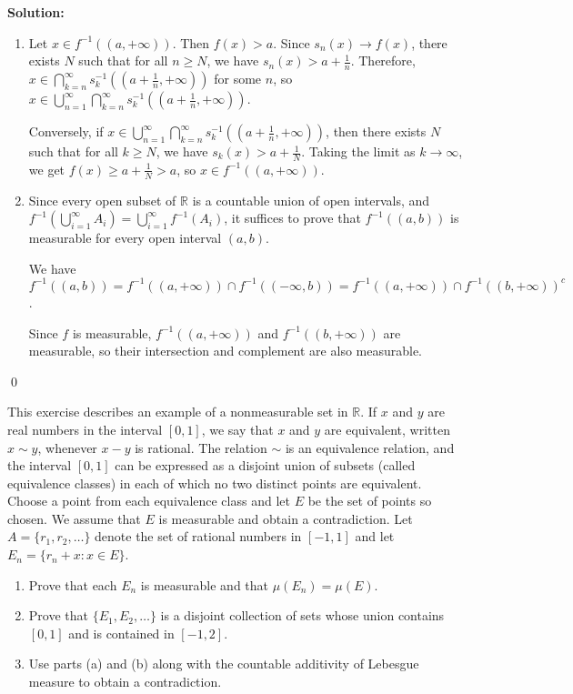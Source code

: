\bigskip\noindent\textbf{Solution:}
\begin{enumerate}[label=(\alph*)]
\item Let $x \in f^{-1}((a, +\infty))$. Then $f(x) > a$. Since $s_n(x) \to f(x)$, there exists $N$ such that for all $n \geq N$, we have $s_n(x) > a + \frac{1}{n}$. Therefore, $x \in \bigcap_{k=n}^\infty s_k^{-1}((a + \frac{1}{n}, +\infty))$ for some $n$, so $x \in \bigcup_{n=1}^\infty \bigcap_{k=n}^\infty s_k^{-1}((a + \frac{1}{n}, +\infty))$.

Conversely, if $x \in \bigcup_{n=1}^\infty \bigcap_{k=n}^\infty s_k^{-1}((a + \frac{1}{n}, +\infty))$, then there exists $N$ such that for all $k \geq N$, we have $s_k(x) > a + \frac{1}{N}$. Taking the limit as $k \to \infty$, we get $f(x) \geq a + \frac{1}{N} > a$, so $x \in f^{-1}((a, +\infty))$.

\item Since every open subset of $\mathbb{R}$ is a countable union of open intervals, and $f^{-1}(\bigcup_{i=1}^{\infty} A_i) = \bigcup_{i=1}^{\infty} f^{-1}(A_i)$, it suffices to prove that $f^{-1}((a, b))$ is measurable for every open interval $(a, b)$.

We have $f^{-1}((a, b)) = f^{-1}((a, +\infty)) \cap f^{-1}((-\infty, b)) = f^{-1}((a, +\infty)) \cap f^{-1}((b, +\infty))^c$.

Since $f$ is measurable, $f^{-1}((a, +\infty))$ and $f^{-1}((b, +\infty))$ are measurable, so their intersection and complement are also measurable.
\end{enumerate}\qed


\begin{problembox}
\begin{problemstatement}
This exercise describes an example of a nonmeasurable set in $\mathbb{R}$. If $x$ and $y$ are real numbers in the interval $[0, 1]$, we say that $x$ and $y$ are equivalent, written $x \sim y$, whenever $x - y$ is rational. The relation $\sim$ is an equivalence relation, and the interval $[0, 1]$ can be expressed as a disjoint union of subsets (called equivalence classes) in each of which no two distinct points are equivalent. Choose a point from each equivalence class and let $E$ be the set of points so chosen. We assume that $E$ is measurable and obtain a contradiction. Let $A = \{r_1, r_2, \ldots \}$ denote the set of rational numbers in $[-1, 1]$ and let $E_n = \{r_n + x : x \in E\}$.
\begin{enumerate}[label=(\alph*)]
\item Prove that each $E_n$ is measurable and that $\mu(E_n) = \mu(E)$.
\item Prove that $\{E_1, E_2, \ldots \}$ is a disjoint collection of sets whose union contains $[0, 1]$ and is contained in $[-1, 2]$.
\item Use parts (a) and (b) along with the countable additivity of Lebesgue measure to obtain a contradiction.
\end{enumerate}
\end{problemstatement}
\end{problembox}

